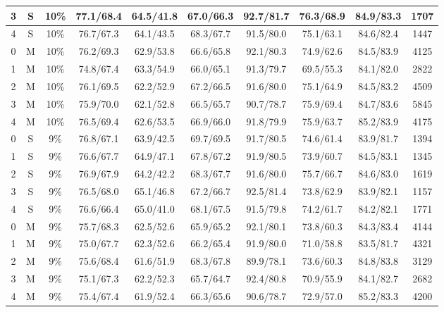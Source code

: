 \begin{table*}
{\begin{tabular}{|c|c|c||c|c|c|c|c|c||c|}
3 & S & 10\% & 77.1/68.4 & 64.5/41.8 & 67.0/66.3 & 92.7/81.7 & 76.3/68.9 & 84.9/83.3 & 1707 \\ \hline
4 & S & 10\% & 76.7/67.3 & 64.1/43.5 & 68.3/67.7 & 91.5/80.0 & 75.1/63.1 & 84.6/82.4 & 1447 \\ \hline
0 & M & 10\% & 76.2/69.3 & 62.9/53.8 & 66.6/65.8 & 92.1/80.3 & 74.9/62.6 & 84.5/83.9 & 4125 \\ \hline
1 & M & 10\% & 74.8/67.4 & 63.3/54.9 & 66.0/65.1 & 91.3/79.7 & 69.5/55.3 & 84.1/82.0 & 2822 \\ \hline
2 & M & 10\% & 76.1/69.5 & 62.2/52.9 & 67.2/66.5 & 91.6/80.0 & 75.1/64.9 & 84.5/83.2 & 4509 \\ \hline
3 & M & 10\% & 75.9/70.0 & 62.1/52.8 & 66.5/65.7 & 90.7/78.7 & 75.9/69.4 & 84.7/83.6 & 5845 \\ \hline
4 & M & 10\% & 76.5/69.4 & 62.6/53.5 & 66.9/66.0 & 91.8/79.9 & 75.9/63.7 & 85.2/83.9 & 4175 \\ \hline
0 & S & 9\% & 76.8/67.1 & 63.9/42.5 & 69.7/69.5 & 91.7/80.5 & 74.6/61.4 & 83.9/81.7 & 1394 \\ \hline
1 & S & 9\% & 76.6/67.7 & 64.9/47.1 & 67.8/67.2 & 91.9/80.5 & 73.9/60.7 & 84.5/83.1 & 1345 \\ \hline
2 & S & 9\% & 76.9/67.9 & 64.2/42.2 & 68.3/67.7 & 91.6/80.0 & 75.7/66.7 & 84.6/83.0 & 1619 \\ \hline
3 & S & 9\% & 76.5/68.0 & 65.1/46.8 & 67.2/66.7 & 92.5/81.4 & 73.8/62.9 & 83.9/82.1 & 1157 \\ \hline
4 & S & 9\% & 76.6/66.4 & 65.0/41.0 & 68.1/67.5 & 91.5/79.8 & 74.2/61.7 & 84.2/82.1 & 1771 \\ \hline
0 & M & 9\% & 75.7/68.3 & 62.5/52.6 & 65.9/65.2 & 92.1/80.1 & 73.8/60.3 & 84.3/83.4 & 4144 \\ \hline
1 & M & 9\% & 75.0/67.7 & 62.3/52.6 & 66.2/65.4 & 91.9/80.0 & 71.0/58.8 & 83.5/81.7 & 4321 \\ \hline
2 & M & 9\% & 75.6/68.4 & 61.6/51.9 & 68.3/67.8 & 89.9/78.1 & 73.6/60.3 & 84.8/83.8 & 3129 \\ \hline
3 & M & 9\% & 75.1/67.3 & 62.2/52.3 & 65.7/64.7 & 92.4/80.8 & 70.9/55.9 & 84.1/82.7 & 2682 \\ \hline
4 & M & 9\% & 75.4/67.4 & 61.9/52.4 & 66.3/65.6 & 90.6/78.7 & 72.9/57.0 & 85.2/83.3 & 4200 \\ \hline

\end{tabular}}
\end{table*}
